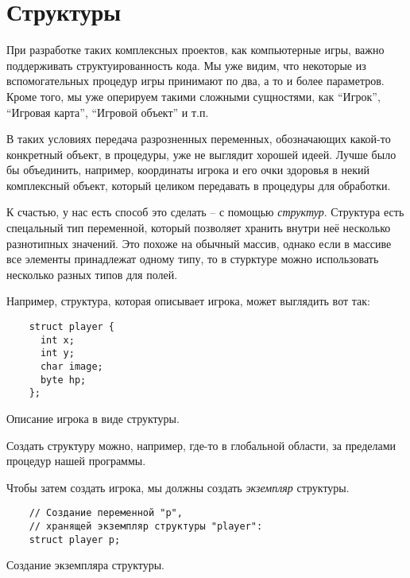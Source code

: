 \documentclass[../sparc.tex]{subfiles}
\begin{document}
\section{Структуры}

При разработке таких комплексных проектов, как компьютерные игры, важно
поддерживать структуированность кода.  Мы уже видим, что некоторые из
вспомогательных процедур игры принимают по два, а то и более параметров.  Кроме
того, мы уже оперируем такими сложными сущностями, как ``Игрок'', ``Игровая
карта'', ``Игровой объект'' и т.п.

В таких условиях передача разрозненных переменных, обозначающих какой-то
конкретный объект, в процедуры, уже не выглядит хорошей идеей.  Лучше было бы
объединить, например, координаты игрока и его очки здоровья в некий комплексный
объект, который целиком передавать в процедуры для обработки.

К счастью, у нас есть способ это сделать -- с помощью \emph{структур}.  Структура
есть спецальный тип переменной, который позволяет хранить внутри неё несколько
разнотипных значений.  Это похоже на обычный массив, однако если в массиве все
элементы принадлежат одному типу, то в стурктуре можно использовать несколько
разных типов для полей.

Например, структура, которая описывает игрока, может выглядить вот так:

\begin{listing}[H]
  \begin{verbatim}
    struct player {
      int x;
      int y;
      char image;
      byte hp;
    };
  \end{verbatim}
  \caption{Описание игрока в виде структуры.}
  \label{listing:game-dev-structure}
\end{listing}

Создать структуру можно, например, где-то в глобальной области, за пределами
процедур нашей программы.

Чтобы затем создать игрока, мы должны создать \emph{экземпляр} структуры.

\begin{listing}[H]
  \begin{verbatim}
    // Создание переменной "p",
    // хранящей экземпляр структуры "player":
    struct player p;
  \end{verbatim}
  \caption{Создание экземпляра структуры.}
  \label{listing:game-dev-structure-instance}
\end{listing}
\end{document}

